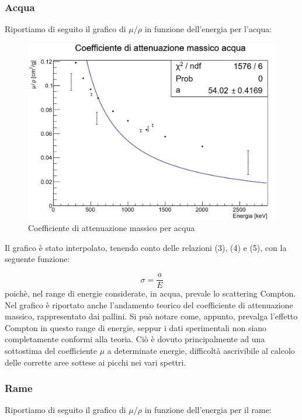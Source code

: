 \documentclass[a4paper,10pt]{article}
\begin{document}
\subsubsection{Acqua}
Riportiamo di seguito il grafico di $\mu/\rho$ in funzione dell'energia per l'acqua:

\begin{figure}[H]
    \centering
    \includegraphics[scale=0.6]{grafici/massicoacqua}
    \caption{Coefficiente di attenuazione massico per acqua}
\end{figure}

\noindent Il grafico \`e stato interpolato, tenendo conto delle relazioni (3), (4) e (5), con la seguente funzione:

\begin{equation}
	\sigma = \frac{a}{E}
\end{equation}
\noindent poich\`e, nel range di energie considerate, in acqua, prevale lo scattering Compton. Nel grafico \`e riportato anche l'andamento teorico del coefficiente di attenuazione massico, rappresentato dai pallini. Si pu\`o notare come, appunto, prevalga l'effetto Compton in questo range di energie, seppur i dati sperimentali non siano completamente conformi alla teoria. Ci\`o \`e dovuto principalmente ad una sottostima del coefficiente $\mu$ a determinate energie, difficolt\`a ascrivibile al calcolo delle corrette aree sottese ai picchi nei vari spettri.  

\subsubsection{Rame}
Riportiamo di seguito il grafico di $\mu/\rho$ in funzione dell'energia per il rame:
\end{document}
